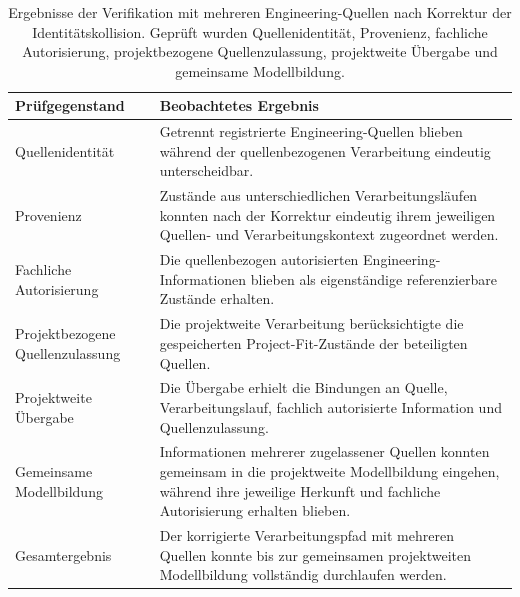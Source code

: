 \begin{table}[htbp]
    \centering
    \small
    \caption[Ergebnisse der Verarbeitung mehrerer Quellen]{
        Ergebnisse der Verifikation mit mehreren Engineering-Quellen nach
        Korrektur der Identitätskollision. Geprüft wurden Quellenidentität,
        Provenienz, fachliche Autorisierung, projektbezogene Quellenzulassung,
        projektweite Übergabe und gemeinsame Modellbildung.}
    \label{tab:validation_multisource_results}
    \begin{tabular}{p{4.4cm}p{8.6cm}}
        \hline
        \textbf{Prüfgegenstand} &
        \textbf{Beobachtetes Ergebnis} \\
        \hline

        Quellenidentität &
        Getrennt registrierte Engineering-Quellen blieben während der
        quellenbezogenen Verarbeitung eindeutig unterscheidbar. \\

        Provenienz &
        Zustände aus unterschiedlichen Verarbeitungsläufen konnten nach der
        Korrektur eindeutig ihrem jeweiligen Quellen- und
        Verarbeitungskontext zugeordnet werden. \\

        Fachliche Autorisierung &
        Die quellenbezogen autorisierten Engineering-Informationen blieben
        als eigenständige referenzierbare Zustände erhalten. \\

        Projektbezogene Quellenzulassung &
        Die projektweite Verarbeitung berücksichtigte die gespeicherten
        Project-Fit-Zustände der beteiligten Quellen. \\

        Projektweite Übergabe &
        Die Übergabe erhielt die Bindungen an Quelle, Verarbeitungslauf,
        fachlich autorisierte Information und Quellenzulassung. \\

        Gemeinsame Modellbildung &
        Informationen mehrerer zugelassener Quellen konnten gemeinsam in
        die projektweite Modellbildung eingehen, während ihre jeweilige
        Herkunft und fachliche Autorisierung erhalten blieben. \\

        Gesamtergebnis &
        Der korrigierte Verarbeitungspfad mit mehreren Quellen konnte bis
        zur gemeinsamen projektweiten Modellbildung vollständig durchlaufen
        werden. \\
        \hline
    \end{tabular}
\end{table}

